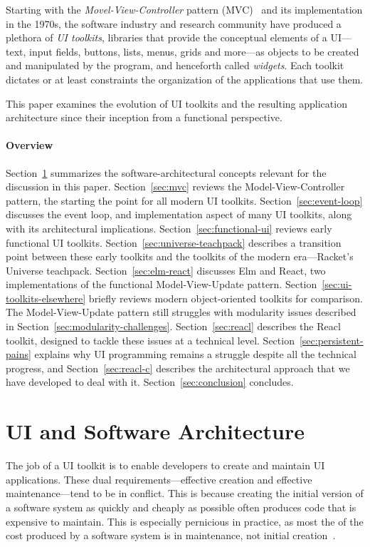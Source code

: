 \documentclass[sigplan,screen]{acmart}
\begin{document}
Starting with the \textit{Movel-View-Controller} pattern
(MVC)~\cite{MVC} and its implementation in the 1970s, the software
industry and research community have produced a plethora of \textit{UI
  toolkits}, libraries that provide the conceptual elements of a
UI---text, input fields, buttons, lists, menus, grids and more---as
objects to be created and manipulated by the program, and henceforth
called \textit{widgets}.  Each toolkit dictates or at least
constraints the organization of the applications that use them.

This paper examines the evolution of UI toolkits and the resulting
application architecture since their inception from a functional
perspective.

\paragraph{Overview} Section~\ref{sec:ui-and-architecture} summarizes
the software-architectural concepts relevant for the discussion in
this paper.  Section~\ref{sec:mvc} reviews the Model-View-Controller
pattern, the starting the point for all modern UI toolkits.
Section~\ref{sec:event-loop} discusses the event loop, and
implementation aspect of many UI toolkits, along with its
architectural implications.  Section~\ref{sec:functional-ui} reviews
early functional UI toolkits.  Section~\ref{sec:universe-teachpack}
describes a transition point between these early toolkits and the
toolkits of the modern era---Racket's Universe teachpack.
Section~\ref{sec:elm-react} discusses Elm and React, two
implementations of the functional Model-View-Update pattern.
Section~\ref{sec:ui-toolkits-elsewhere} briefly reviews modern
object-oriented toolkits for comparison.  The Model-View-Update
pattern still struggles with modularity issues described in
Section~\ref{sec:modularity-challenges}.  Section~\ref{sec:reacl}
describes the Reacl toolkit, designed to tackle these issues at a
technical level.  Section~\ref{sec:persistent-pains} explains why UI
programming remains a struggle despite all the technical progress, and
Section~\ref{sec:reacl-c} describes the architectural approach that we
have developed to deal with it.  Section~\ref{sec:conclusion} concludes.


\section{UI and Software Architecture}
\label{sec:ui-and-architecture}

The job of a UI toolkit is to enable developers to create and maintain
UI applications.  These dual requirements---effective creation and
effective maintenance---tend to be in conflict.  This is because
creating the initial version of a software system as quickly and
cheaply as possible often produces code that is expensive to maintain.
This is especially pernicious in practice, as most the of the cost
produced by a software system is in maintenance, not initial
creation~\cite{GreenBook}.
\end{document}

